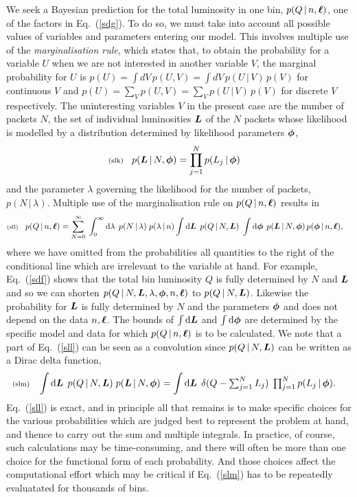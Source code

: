 \documentclass[11pt]{article}
\newcommand{\lleq}[1]{\label{#1} }
\renewcommand{\lleq}[1]{\label{#1} {\scriptstyle {\rm (#1)}} \hspace*{2ex} }
\newcommand{\cond}{\,|\,}
\newcommand{\refeq}[1]{Eq.~(\ref{#1})}
\newcommand{\rmdx}[1]{\dd{#1}} %
\begin{document}
We seek a Bayesian prediction for the total luminosity in one bin,
$p(Q\cond n,\bml)$, one of the factors in Eq.~(\ref{sdg}).  To do so,
we must take into account all possible values of variables and
parameters entering our model.  This involves multiple use of the
\textit{marginalisation rule}, which states that, to obtain the
probability for a variable $U$ when we are not interested in another
variable $V$, the marginal probability for $U$ is %
$p(U) = \int dV\,p(U,V) = \int dV\,p(U\cond V)\,p(V)$ for continuous
$V$ and $p(U) = \sum_V p(U,V) = \sum_V p(U\cond V)\,p(V)$ for discrete
$V$ respectively.
%
The uninteresting variables $V$ in the present case are the number of
packets $N$, the set of individual luminosities ${\bm{L}}$ of the $N$ packets
whose likelihood is modelled by a distribution determined by
likelihood parameters ${\bm{\phi}}$,
\begin{align}
  \lleq{slk}
  p(\bmL\cond N,\bmphi)
  &= \prod_{j=1}^{N} p(L_j\cond \bmphi)
\end{align}
and the parameter $\lambda$ governing the likelihood for the number of
packets, $p(N\cond\lambda)$. Multiple use of the marginalisation rule
on $p(Q\cond n,\bml)$ results in
\begin{align}
  \lleq{sll}
  p(Q\cond n,\bml)
  &= \sum_{N=0}^\infty \;\int_0^\infty \rmdx{\lambda}\;
    p(N\cond\lambda)\;
    p(\lambda\cond n)
    \int \rmdx{\bmL}\;
    p(Q\cond N,\bmL)\;
    \int \rmdx{\bmphi}\;
    p(\bmL\cond N,\bmphi)\,
    p(\bmphi\cond n,\bml),
\end{align}
where we have omitted from the probabilities all quantities to the
right of the conditional line which are irrelevant to the variable at
hand. For example, Eq.~(\ref{sdf}) shows that the total bin luminosity
$Q$ is fully determined by $N$ and ${\bm{L}}$ and so we can shorten
$p(Q\cond N,\bmL,\lambda,\bmphi,n,\bml)$ to $p(Q\cond N,\bmL)$. %
Likewise the probability for ${\bm{L}}$ is fully determined by $N$ and the
parameters ${\bm{\phi}}$ and does not depend on the data $n,{\bm{\ell}}$.  The
bounds of $\int \rmdx{\bmL}$ and $\int \rmdx{\bmphi}$ are determined by the
specific model and data for which $p(Q\cond n,\bml)$ is to be
calculated.
%
We note that a part of Eq.~(\ref{sll}) can be seen as a convolution
since $p(Q\cond N,\bmL)$ can be written as a Dirac delta function,
\begin{align}
  \lleq{slm}
  \int \rmdx{\bmL}\; p(Q\cond N,\bmL)\; p(\bmL\cond N,\bmphi)
  &= \int \rmdx{\bmL}\;\delta(Q - \textstyle\sum_{j=1}^N L_j)\; \prod_{j=1}^N p(L_j\cond \bmphi).
\end{align}
Eq.~(\ref{sll}) is exact, and in principle all that remains is to make
specific choices for the various probabilities which are judged best
to represent the problem at hand, and thence to carry out the sum and
multiple integrals. In practice, of course, such calculations may be
time-consuming, and there will often be more than one choice for the
functional form of each probability. And those choices affect the
computational effort which may be critical if \refeq{slm} has to be
repeatedly evaluatated for thousands of bins.
\end{document}
